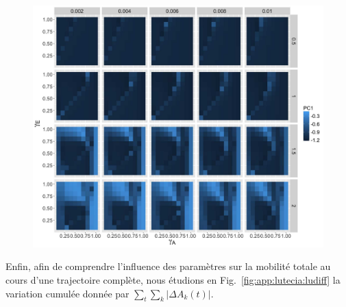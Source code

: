 \begin{figure}
	\includegraphics[width=\linewidth]{Figures/Final/A-lutecia-morphosens.jpg}
\end{figure}



Enfin, afin de comprendre l'influence des paramètres sur la mobilité totale au cours d'une trajectoire complète, nous étudions en Fig.~\ref{fig:app:lutecia:ludiff} la variation cumulée donnée par $\sum_t \sum_k \left|\Delta A_k (t)\right|$.


